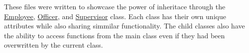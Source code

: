 These files were written to showcase the power of inheritace through the \mbox{\hyperlink{classEmployee}{Employee}}, \mbox{\hyperlink{classOfficer}{Officer}}, and \mbox{\hyperlink{classSupervisor}{Supervisor}} class. Each class has their own unique attributes while also sharing simmilar functionality. The child classes also have the ability to access functions from the main class even if they had been overwritten by the current class. 